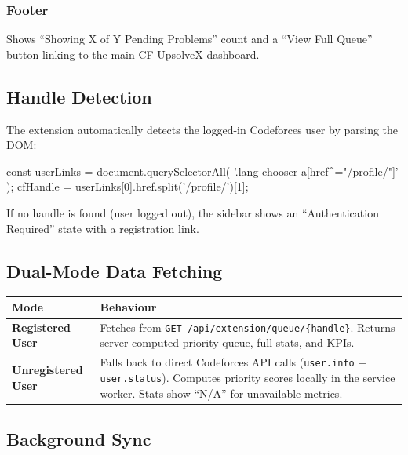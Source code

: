 \documentclass[11pt, a4paper]{article}
\begin{document}
\subsubsection{Footer}

Shows ``Showing X of Y Pending Problems'' count and a ``View Full Queue''
button linking to the main CF UpsolveX dashboard.

\subsection{Handle Detection}

The extension automatically detects the logged-in Codeforces user by
parsing the DOM:

\begin{codebox}
const userLinks = document.querySelectorAll(
  '.lang-chooser a[href^="/profile/"]'
);
cfHandle = userLinks[0].href.split('/profile/')[1];
\end{codebox}

If no handle is found (user logged out), the sidebar shows an
``Authentication Required'' state with a registration link.

\subsection{Dual-Mode Data Fetching}

\begin{center}
\begin{tabularx}{0.95\linewidth}{>{\bfseries\color{accent}}l X}
\toprule
\rowcolor{bgaccent}
\color{textsecondary}Mode & \color{textsecondary}Behaviour \\
\midrule
Registered User   & Fetches from \texttt{GET /api/extension/queue/\{handle\}}.
                    Returns server-computed priority queue, full stats, and KPIs. \\
Unregistered User & Falls back to direct Codeforces API calls
                    (\texttt{user.info} + \texttt{user.status}). Computes
                    priority scores locally in the service worker.
                    Stats show ``N/A'' for unavailable metrics. \\
\bottomrule
\end{tabularx}
\end{center}

\subsection{Background Sync}
\end{document}
